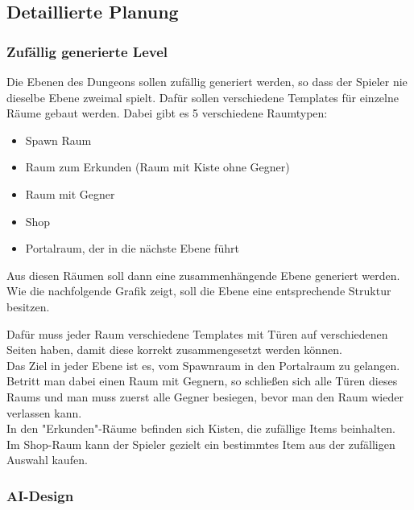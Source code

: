 \subsection{Detaillierte Planung}
\subsubsection{Zufällig generierte Level}
Die Ebenen des Dungeons sollen zufällig generiert werden, so dass der Spieler nie dieselbe Ebene zweimal spielt. Dafür sollen verschiedene Templates für einzelne Räume gebaut werden. Dabei gibt es 5 verschiedene Raumtypen:
\begin{itemize}
\item Spawn Raum
\item Raum zum Erkunden (Raum mit Kiste ohne Gegner)
\item Raum mit Gegner
\item Shop
\item Portalraum, der in die nächste Ebene führt
\end{itemize}
Aus diesen Räumen soll dann eine zusammenhängende Ebene generiert werden. Wie die nachfolgende Grafik zeigt, soll die Ebene eine entsprechende Struktur besitzen.


Dafür muss jeder Raum verschiedene Templates mit Türen auf verschiedenen Seiten haben, damit diese korrekt zusammengesetzt werden können.\\
Das Ziel in jeder Ebene ist es, vom Spawnraum in den Portalraum zu gelangen. Betritt man dabei einen Raum mit Gegnern, so schließen sich alle Türen dieses Raums und man muss zuerst alle Gegner besiegen, bevor man den Raum wieder verlassen kann. \\
In den "Erkunden"-Räume befinden sich Kisten, die zufällige Items beinhalten. Im Shop-Raum kann der Spieler gezielt ein bestimmtes Item aus der zufälligen Auswahl kaufen.

\subsubsection{AI-Design}

